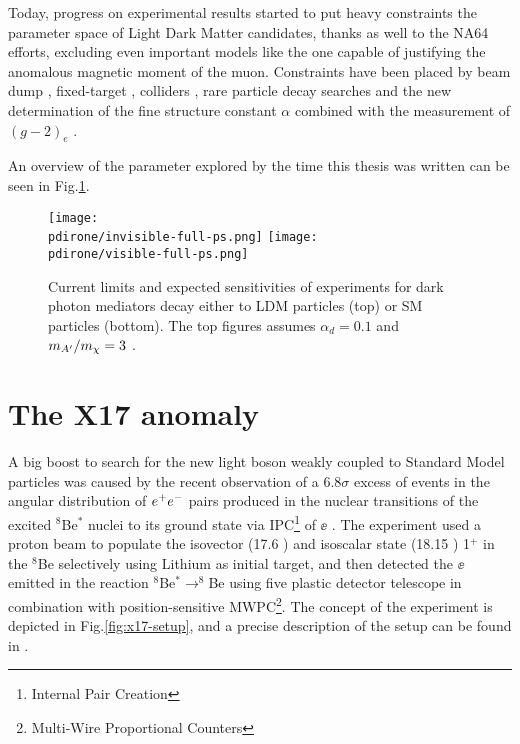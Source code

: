 Today, progress on experimental results started to put heavy constraints the parameter space of Light Dark Matter candidates, thanks as well to the NA64 efforts, excluding even important models like the one capable of justifying the anomalous magnetic moment of the muon. Constraints have been placed by beam dump \cite{jdb, charm, PhysRevLett.59.755, e137, konaka, PhysRevLett.67.2942, dav,  ath, nomad, e787, essig1, blum,sg1, blum1, sarah1}, fixed-target \cite{apex,merkel,merkel1}, colliders \cite{babar, curt, babar1}, rare particle decay searches \cite{sindrum, kloe, sg2, kloe2, wasa, hades, phenix, e949, na48, pol, kloe3} and the new determination of the fine structure constant $\alpha$ combined with the measurement of $(g-2)_e$ \cite{Parker191,PhysRevLett.100.120801}.

An overview of the parameter explored by the time this thesis was written can be seen in Fig.\ref{fig:dmplane-overview}.

\begin{figure}[bth!]
  \centering
  \texttt{[image: \\pdirone/invisible-full-ps.png]}
  \texttt{[image: \\pdirone/visible-full-ps.png]}
  \caption[Current exclusion limit and project for Dark Photon in the physics community]{Current limits and expected sensitivities of experiments for dark photon mediators decay either to LDM particles (top) or SM particles (bottom). The top figures assumes $\alpha_d = 0.1$ and $m_{A'}/m_{\chi} = 3$ \cite{pbc-book}.}
  \label{fig:dmplane-overview}
\end{figure}  

\section{The X17 anomaly}
\label{ch1:sec:dm-u1model-motivations-x17}

A big boost to search for the new light boson weakly coupled to Standard Model particles was caused by the recent observation of a 6.8$\sigma$ excess of events in the angular distribution of $e^+e^-$ pairs produced in the nuclear transitions of the excited $^8$Be$^*$ nuclei to its ground state via IPC\footnote{Internal Pair Creation} of $\ee$ \cite{Krasznahorkay:2015iga}. The experiment used a proton beam to populate the isovector (17.6 \mev) and isoscalar state (18.15 \mev) 1$^+$ in the $^8$Be selectively using Lithium as initial target, and then detected the $\ee$ emitted in the reaction $^8$Be$^* \to ^8$Be using five plastic detector telescope in combination with position-sensitive MWPC\footnote{Multi-Wire Proportional Counters}. The concept of the experiment is depicted in Fig.\ref{fig:x17-setup}, and a precise description of the setup can be found in \cite{GULYAS201621}.

